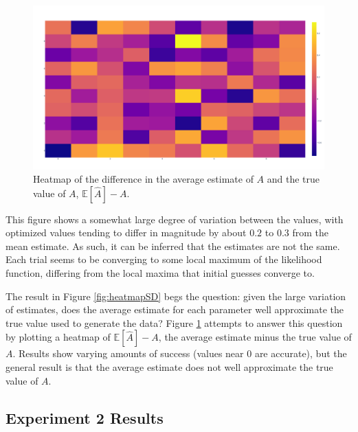 \documentclass{article}
\theoremstyle{definition}
\begin{document}
\vspace{-0.5in}

\begin{figure}[hbt!]
    \par
    \begin{center}
    \caption{Heatmap of the difference in the average estimate of $A$ and the true value of $A$, $\mathbb{E}[\hat{A}] - A$.}
    \label{fig:heatmapAVG}
    \includegraphics[scale=0.1]{Figures/heatmap_average_minus_true.png}
    \end{center}
    \par
    \vspace{-0.25in}
    \medskip
\end{figure}

\newpage

This figure shows a somewhat large degree of variation between the values, with optimized values tending to differ in magnitude by about $0.2$ to $0.3$ from the mean estimate. As such, it can be inferred that the estimates are not the same. Each trial seems to be converging to some local maximum of the likelihood function, differing from the local maxima that initial guesses converge to.

The result in Figure \ref{fig:heatmapSD} begs the question: given the large variation of estimates, does the average estimate for each parameter well approximate the true value used to generate the data? Figure \ref{fig:heatmapAVG} attempts to answer this question by plotting a heatmap of $\mathbb{E}[\hat{A}] - A$, the average estimate minus the true value of $A$. Results show varying amounts of success (values near $0$ are accurate), but the general result is that the average estimate does not well approximate the true value of $A$.


\subsection{Experiment 2 Results}
\label{subsec:Exper2Results}
\end{document}
